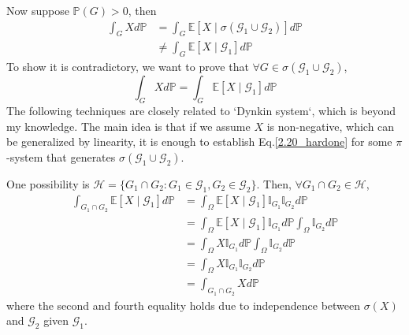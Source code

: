 \begin{enumerate}
    Now suppose $\mathbb{P}(G) > 0$, then
    \begin{equation}
        \begin{split}
            \int_{G} X d \mathbb{P}
            &= \int_{G} \mathbb{E}\left[X \mid \sigma\left(\mathcal{G}_{1} \cup \mathcal{G}_{2}\right)\right] d \mathbb{P} \\
            &\neq \int_{G} \mathbb{E}\left[X \mid \mathcal{G}_{1}\right] d \mathbb{P}
        \end{split}
    \end{equation}
    To show it is contradictory, we want to prove that $\forall G \in \sigma\left(\mathcal{G}_{1} \cup \mathcal{G}_{2}\right)$,
    \begin{equation} \label{2.20_hardone}
        \int_{G} X d \mathbb{P} = \int_{G} \mathbb{E}\left[X \mid \mathcal{G}_{1}\right] d \mathbb{P}
    \end{equation}
    The following techniques are closely related to `Dynkin system`, which is beyond my knowledge.
    The main idea is that if we assume $X$ is non-negative, which can be generalized by linearity, it is enough to establish Eq.\ref{2.20_hardone} for some $\pi$-system that generates $\sigma\left(\mathcal{G}_{1} \cup \mathcal{G}_{2}\right)$.

    One possibility is $\mathcal{H}=\{G_1 \cap G_2: G_1 \in \mathcal{G}_1, G_2 \in \mathcal{G}_2\}$.
    Then, $\forall G_1 \cap G_2 \in \mathcal{H}$,
    \begin{equation}
        \begin{split}
            \int_{G_1 \cap G_2} \mathbb{E}\left[X \mid \mathcal{G}_{1}\right] d \mathbb{P}
            &= \int_{\Omega} \mathbb{E}\left[X \mid \mathcal{G}_{1}\right] \mathbb{I}_{G_1} \mathbb{I}_{G_2} d \mathbb{P} \\
            &= \int_{\Omega} \mathbb{E}\left[X \mid \mathcal{G}_{1}\right] \mathbb{I}_{G_1} d \mathbb{P} \int_{\Omega} \mathbb{I}_{G_2} d \mathbb{P} \\
            &= \int_{\Omega} X \mathbb{I}_{G_1} d \mathbb{P}
            \int_{\Omega} \mathbb{I}_{G_2} d \mathbb{P} \\
            &= \int_{\Omega} X \mathbb{I}_{G_1} \mathbb{I}_{G_2} d \mathbb{P} \\
            &= \int_{G_1 \cap G_2} X d \mathbb{P}
        \end{split}
    \end{equation}
    where the second and fourth equality holds due to independence between $\sigma(X)$ and $\mathcal{G}_2$ given $\mathcal{G}_1$.


\end{enumerate}
